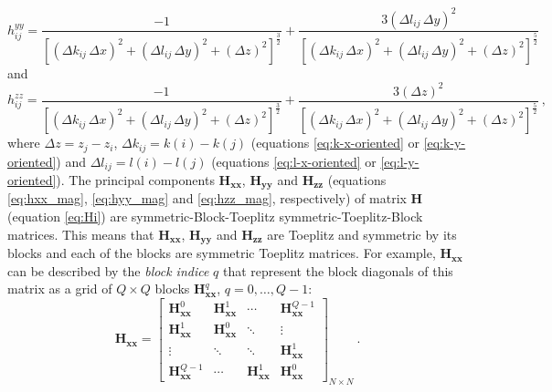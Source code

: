 \begin{equation}
	h^{yy}_{ij} = \frac{-1}{ \left[ 
		\left( \Delta k_{ij} \, \Delta x \right)^{2} + 
		\left( \Delta l_{ij} \, \Delta y \right)^{2} + 
		\left( \Delta z \right)^{2} \right]^{\frac{3}{2}}} + 
	\frac{3 (\Delta l_{ij} \, \Delta y )^{2}}{\left[ 
		\left( \Delta k_{ij} \, \Delta x \right)^{2} + 
		\left( \Delta l_{ij} \, \Delta y \right)^{2} + 
		\left( \Delta z \right)^{2} \right]^{\frac{5}{2}}} \: 
	\label{eq:hyy_mag}
\end{equation}
and
\begin{equation}
	h^{zz}_{ij} = \frac{-1}{ \left[ 
		\left( \Delta k_{ij} \, \Delta x \right)^{2} + 
		\left( \Delta l_{ij} \, \Delta y \right)^{2} + 
		\left( \Delta z \right)^{2} \right]^{\frac{3}{2}}} + 
	\frac{3 (\Delta z )^{2}}{\left[ 
		\left( \Delta k_{ij} \, \Delta x \right)^{2} + 
		\left( \Delta l_{ij} \, \Delta y \right)^{2} + 
		\left( \Delta z \right)^{2} \right]^{\frac{5}{2}}} \: ,
	\label{eq:hzz_mag}
\end{equation}
where $\Delta z = z_j - z_i$, $\Delta k_{ij} =k(i) - k(j)$ (equations \ref{eq:k-x-oriented} or \ref{eq:k-y-oriented}) and $\Delta l_{ij} = l(i) - l(j)$ (equations \ref{eq:l-x-oriented} or \ref{eq:l-y-oriented}).
The principal components $\mathbf{H_{xx}}$, $\mathbf{H_{yy}}$ and $\mathbf{H_{zz}}$ (equations \ref{eq:hxx_mag}, \ref{eq:hyy_mag} and \ref{eq:hzz_mag}, respectively) of matrix $\mathbf{H}$ (equation \ref{eq:Hi}) are symmetric-Block-Toeplitz symmetric-Toeplitz-Block matrices. This means that $\mathbf{H_{xx}}$, $\mathbf{H_{yy}}$ and $\mathbf{H_{zz}}$ are Toeplitz and symmetric by its blocks and each of the blocks are symmetric Toeplitz matrices. 
For example, $\mathbf{H_{xx}}$ can be described by the \textit{block indice} $q$ that represent the block diagonals of this matrix as a grid of $Q \times Q$ blocks $\mathbf{H}^{q}_\mathbf{xx}$, $q = 0, \dots, Q - 1$:
\begin{equation}
\mathbf{H_{xx}} = \begin{bmatrix}
\mathbf{H}^{0}_\mathbf{xx}  & \mathbf{H}^{1}_\mathbf{xx} & \cdots         & \mathbf{H}^{Q-1}_\mathbf{xx} \\
\mathbf{H}^{1}_\mathbf{xx}  & \mathbf{H}^{0}_\mathbf{xx} & \ddots         & \vdots           \\ 
\vdots           & \ddots         & \ddots         & \mathbf{H}^{1}_\mathbf{xx}   \\
\mathbf{H}^{Q-1}_\mathbf{xx} & \cdots         & \mathbf{H}^{1}_\mathbf{xx} & \mathbf{H}^{0}_\mathbf{xx}                
\end{bmatrix}_{N \times N} \: .
\label{eq:BTTB_Hxx}
\end{equation}
